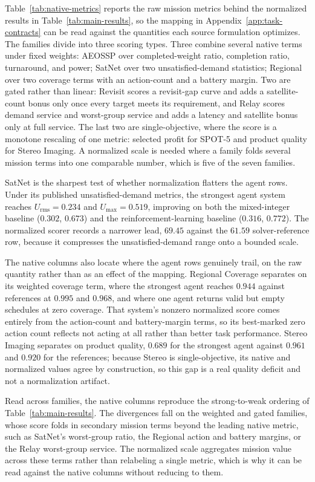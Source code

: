 \documentclass[11pt]{article}
\begin{document}
Table~\ref{tab:native-metrics} reports the raw mission metrics behind the normalized results in Table~\ref{tab:main-results}, so the mapping in Appendix~\ref{app:task-contracts} can be read against the quantities each source formulation optimizes. The families divide into three scoring types. Three combine several native terms under fixed weights: AEOSSP over completed-weight ratio, completion ratio, turnaround, and power; SatNet over two unsatisfied-demand statistics; Regional over two coverage terms with an action-count and a battery margin. Two are gated rather than linear: Revisit scores a revisit-gap curve and adds a satellite-count bonus only once every target meets its requirement, and Relay scores demand service and worst-group service and adds a latency and satellite bonus only at full service. The last two are single-objective, where the score is a monotone rescaling of one metric: selected profit for SPOT-5 and product quality for Stereo Imaging. A normalized scale is needed where a family folds several mission terms into one comparable number, which is five of the seven families.

SatNet is the sharpest test of whether normalization flatters the agent rows. Under its published unsatisfied-demand metrics, the strongest agent system reaches $U_{\mathrm{rms}}=0.234$ and $U_{\max}=0.519$, improving on both the mixed-integer baseline ($0.302$, $0.673$) and the reinforcement-learning baseline ($0.316$, $0.772$). The normalized scorer records a narrower lead, $69.45$ against the $61.59$ solver-reference row, because it compresses the unsatisfied-demand range onto a bounded scale.

The native columns also locate where the agent rows genuinely trail, on the raw quantity rather than as an effect of the mapping. Regional Coverage separates on its weighted coverage term, where the strongest agent reaches $0.944$ against references at $0.995$ and $0.968$, and where one agent returns valid but empty schedules at zero coverage. That system's nonzero normalized score comes entirely from the action-count and battery-margin terms, so its best-marked zero action count reflects not acting at all rather than better task performance. Stereo Imaging separates on product quality, $0.689$ for the strongest agent against $0.961$ and $0.920$ for the references; because Stereo is single-objective, its native and normalized values agree by construction, so this gap is a real quality deficit and not a normalization artifact.

Read across families, the native columns reproduce the strong-to-weak ordering of Table~\ref{tab:main-results}. The divergences fall on the weighted and gated families, whose score folds in secondary mission terms beyond the leading native metric, such as SatNet's worst-group ratio, the Regional action and battery margins, or the Relay worst-group service. The normalized scale aggregates mission value across these terms rather than relabeling a single metric, which is why it can be read against the native columns without reducing to them.
\end{document}
